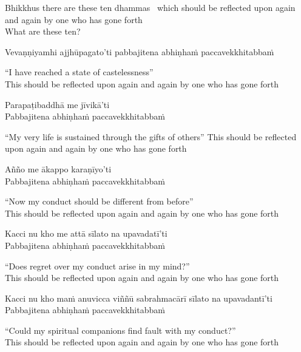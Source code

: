 \begin{english}
  Bhikkhus there are these ten dhammas
  \breathmark\ which should be reflected upon again and again by one who has gone forth\\
  What are these ten?
\end{english}

Vevaṇṇiyamhi ajjhūpagato'ti pabbajitena abhiṇhaṁ paccavekkhitabbaṁ

\begin{english}
  “I have reached a state of castelessness”\\
  This should be reflected upon again and again by one who has gone forth
\end{english}

Parapaṭibaddhā me jīvikā’ti\\
Pabbajitena abhiṇhaṁ paccavekkhitabbaṁ

\begin{english}
  “My very life is sustained through the gifts of others”
  This should be reflected upon again and again by one who has gone forth
\end{english}

Añño me ākappo karaṇīyo'ti\\
Pabbajitena abhiṇhaṁ paccavekkhitabbaṁ

\begin{english}
  “Now my conduct should be different from before”\\
  This should be reflected upon again and again by one who has gone forth
\end{english}

Kacci nu kho me attā sīlato na upavadatī'ti\\
Pabbajitena abhiṇhaṁ paccavekkhitabbaṁ

\begin{english}
  “Does regret over my conduct arise in my mind?”\\
  This should be reflected upon again and again by one who has gone forth
\end{english}

Kacci nu kho maṁ anuvicca viññū sabrahmacārī sīlato na upavadantī'ti\\
Pabbajitena abhiṇhaṁ paccavekkhitabbaṁ

\begin{english}
  “Could my spiritual companions find fault with my conduct?”\\
  This should be reflected upon again and again by one who has gone forth
\end{english}

